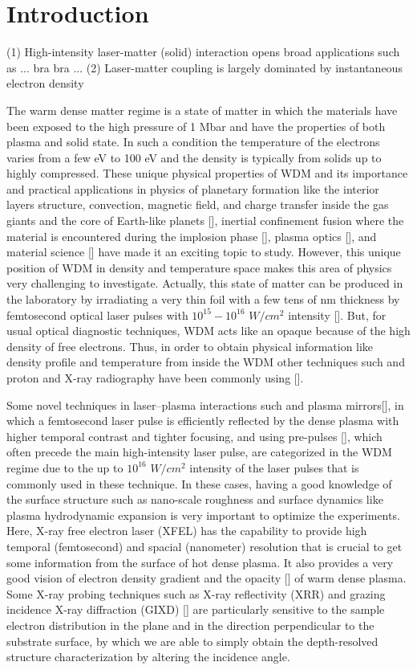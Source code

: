 \documentclass[preprint, 12pt]{elsarticle}
\begin{document}
\section{Introduction}
\label{S:1}

(1) High-intensity laser-matter (solid) interaction opens broad applications such as ... bra bra ...
(2) Laser-matter coupling is largely dominated by instantaneous electron density 




The warm dense matter regime is a state of matter in which the materials have been exposed to the high pressure of 1 Mbar and have the properties of both plasma and solid state. In such a condition the temperature of the electrons varies from a few eV to 100 eV and the density is typically from solids up to highly compressed. These unique physical properties of WDM and its importance and practical applications in physics of planetary formation like the interior layers structure, convection, magnetic field, and charge transfer inside the gas giants and the core of Earth-like planets [], inertial confinement fusion where the material is encountered during the implosion phase [], plasma optics [], and material science [] have made it an exciting topic to study. However, this unique position of WDM in density and temperature space makes this area of physics very challenging to investigate. Actually, this state of matter can be produced in the laboratory by irradiating a very thin foil with a few tens of nm thickness by femtosecond optical laser pulses with $10^{15}-10^{16}$ $W/cm^2$ intensity []. But, for usual optical diagnostic techniques, WDM acts like an opaque because of the high density of free electrons. Thus, in order to obtain physical information like density profile and temperature from inside the WDM other techniques such and proton and X-ray radiography have been commonly using [].

Some novel techniques in laser--plasma interactions such and plasma mirrors[], in which a femtosecond laser pulse is efficiently reflected by the dense plasma with higher temporal contrast and tighter focusing, and using pre-pulses [], which often precede the main high-intensity laser pulse, are categorized in the WDM regime due to the up to $10^{16}$ $W/cm^2$ intensity of the laser pulses that is commonly used in these technique. In these cases, having a good knowledge of the surface structure such as nano-scale roughness and surface dynamics like plasma hydrodynamic expansion is very important to optimize the experiments. Here, X-ray free electron laser (XFEL) has the capability to provide high temporal (femtosecond) and spacial (nanometer) resolution that is crucial to get some information from the surface of hot dense plasma. It also provides a very good vision of electron density gradient and the opacity [] of warm dense plasma. Some X-ray probing techniques such as X-ray reflectivity (XRR) and grazing incidence X-ray diffraction (GIXD) [] are particularly sensitive to the sample electron distribution in the plane and in the direction perpendicular to the substrate surface, by which we are able to simply obtain the depth-resolved structure characterization by altering the incidence angle.
\end{document}
